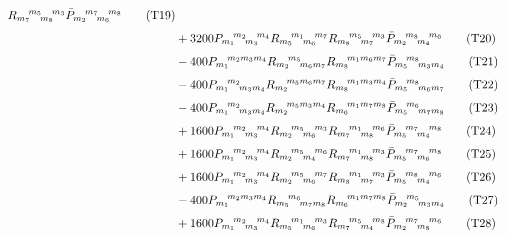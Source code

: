 \begin{align}
        R_{{m_{7}}}\!^{{m_{5}}}\!_{{m_{8}}}\!^{{m_{3}}}
        \Pbar_{{m_{2}}}\!^{{m_{7}}}\!_{{m_{6}}}\!^{{m_{8}}}
  \tag{T19}\label{T19}\\[3pt]
&+3200 P_{{m_{1}}}\!^{{m_{2}}}\!_{{m_{3}}}\!^{{m_{4}}}
        R_{{m_{5}}}\!^{{m_{1}}}\!_{{m_{6}}}\!^{{m_{7}}}
        R_{{m_{8}}}\!^{{m_{5}}}\!_{{m_{7}}}\!^{{m_{3}}}
        \Pbar_{{m_{2}}}\!^{{m_{8}}}\!_{{m_{4}}}\!^{{m_{6}}}
  \tag{T20}\label{T20}\\[3pt]
&-400 P_{{m_{1}}}\!^{{m_{2}} {m_{3}} {m_{4}}}
       R_{{m_{2}}}\!^{{m_{5}}}\!_{{m_{6}} {m_{7}}}
       R_{{m_{8}}}\!^{{m_{1}} {m_{6}} {m_{7}}}
       \Pbar_{{m_{5}}}\!^{{m_{8}}}\!_{{m_{3}} {m_{4}}}
  \tag{T21}\label{T21}\\[3pt]
&-400 P_{{m_{1}}}\!^{{m_{2}}}\!_{{m_{3}} {m_{4}}}
       R_{{m_{2}}}\!^{{m_{5}} {m_{6}} {m_{7}}}
       R_{{m_{8}}}\!^{{m_{1}} {m_{3}} {m_{4}}}
       \Pbar_{{m_{5}}}\!^{{m_{8}}}\!_{{m_{6}} {m_{7}}}
  \tag{T22}\label{T22}\\[3pt]
&-400 P_{{m_{1}}}\!^{{m_{2}}}\!_{{m_{3}} {m_{4}}}
       R_{{m_{2}}}\!^{{m_{5}} {m_{3}} {m_{4}}}
       R_{{m_{6}}}\!^{{m_{1}} {m_{7}} {m_{8}}}
       \Pbar_{{m_{5}}}\!^{{m_{6}}}\!_{{m_{7}} {m_{8}}}
  \tag{T23}\label{T23}\\[3pt]
&+1600 P_{{m_{1}}}\!^{{m_{2}}}\!_{{m_{3}}}\!^{{m_{4}}}
        R_{{m_{2}}}\!^{{m_{5}}}\!_{{m_{6}}}\!^{{m_{3}}}
        R_{{m_{7}}}\!^{{m_{1}}}\!_{{m_{8}}}\!^{{m_{6}}}
        \Pbar_{{m_{5}}}\!^{{m_{7}}}\!_{{m_{4}}}\!^{{m_{8}}}
  \tag{T24}\label{T24}\\[3pt]
&+1600 P_{{m_{1}}}\!^{{m_{2}}}\!_{{m_{3}}}\!^{{m_{4}}}
        R_{{m_{2}}}\!^{{m_{5}}}\!_{{m_{4}}}\!^{{m_{6}}}
        R_{{m_{7}}}\!^{{m_{1}}}\!_{{m_{8}}}\!^{{m_{3}}}
        \Pbar_{{m_{5}}}\!^{{m_{7}}}\!_{{m_{6}}}\!^{{m_{8}}}
  \tag{T25}\label{T25}\\[3pt]
&+1600 P_{{m_{1}}}\!^{{m_{2}}}\!_{{m_{3}}}\!^{{m_{4}}}
        R_{{m_{2}}}\!^{{m_{5}}}\!_{{m_{6}}}\!^{{m_{7}}}
        R_{{m_{8}}}\!^{{m_{1}}}\!_{{m_{7}}}\!^{{m_{3}}}
        \Pbar_{{m_{5}}}\!^{{m_{8}}}\!_{{m_{4}}}\!^{{m_{6}}}
  \tag{T26}\label{T26}\\[3pt]
&-400 P_{{m_{1}}}\!^{{m_{2}} {m_{3}} {m_{4}}}
       R_{{m_{5}}}\!^{{m_{6}}}\!_{{m_{7}} {m_{8}}}
       R_{{m_{6}}}\!^{{m_{1}} {m_{7}} {m_{8}}}
       \Pbar_{{m_{2}}}\!^{{m_{5}}}\!_{{m_{3}} {m_{4}}}
  \tag{T27}\label{T27}\\[3pt]
&+1600 P_{{m_{1}}}\!^{{m_{2}}}\!_{{m_{3}}}\!^{{m_{4}}}
        R_{{m_{5}}}\!^{{m_{1}}}\!_{{m_{6}}}\!^{{m_{3}}}
        R_{{m_{7}}}\!^{{m_{5}}}\!_{{m_{4}}}\!^{{m_{8}}}
        \Pbar_{{m_{2}}}\!^{{m_{7}}}\!_{{m_{8}}}\!^{{m_{6}}}
  \tag{T28}\label{T28}
\end{align}

